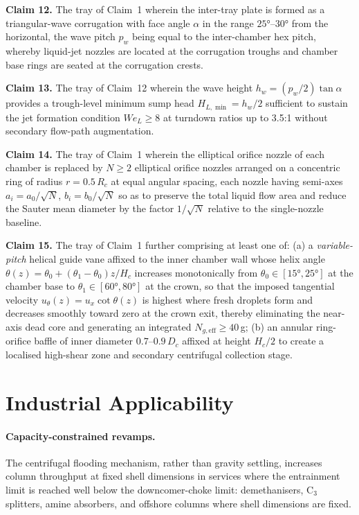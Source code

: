 \documentclass[11pt,letterpaper]{article}
\newcommand{\We}{\mathit{We}}
\begin{document}
\textbf{Claim 12.}
The tray of Claim~1 wherein the inter-tray plate is formed as a
triangular-wave corrugation with face angle $\alpha$ in the range
$25°$--$30°$ from the horizontal, the wave pitch $p_w$ being equal to
the inter-chamber hex pitch, whereby liquid-jet nozzles are located at
the corrugation troughs and chamber base rings are seated at the
corrugation crests.

\textbf{Claim 13.}
The tray of Claim~12 wherein the wave height $h_w = (p_w/2)\tan\alpha$
provides a trough-level minimum sump head $H_{L,\min} = h_w/2$
sufficient to sustain the jet formation condition
$\We_L \ge 8$ at turndown ratios up to 3.5:1 without secondary
flow-path augmentation.

\textbf{Claim 14.}
The tray of Claim~1 wherein the elliptical orifice nozzle of each
chamber is replaced by $N \ge 2$ elliptical orifice nozzles arranged
on a concentric ring of radius $r = 0.5\,R_c$ at equal angular spacing,
each nozzle having semi-axes $a_i = a_0/\sqrt{N}$, $b_i = b_0/\sqrt{N}$
so as to preserve the total liquid flow area and reduce the Sauter mean
diameter by the factor $1/\sqrt{N}$ relative to the single-nozzle
baseline.

\textbf{Claim 15.}
The tray of Claim~1 further comprising at least one of: (a) a
\emph{variable-pitch} helical guide vane affixed to the inner
chamber wall whose helix angle $\theta(z) = \theta_0 +
(\theta_1-\theta_0)z/H_c$ increases monotonically from
$\theta_0 \in [15°, 25°]$ at the chamber base to
$\theta_1 \in [60°, 80°]$ at the crown, so that the imposed
tangential velocity $u_\theta(z) = u_x\cot\theta(z)$ is highest
where fresh droplets form and decreases smoothly toward zero at
the crown exit, thereby eliminating the near-axis dead core and
generating an integrated $N_{g,\mathrm{eff}} \ge 40$\,g; (b) an
annular ring-orifice baffle of inner diameter $0.7$--$0.9\,D_c$
affixed at height $H_c/2$ to create a localised high-shear zone
and secondary centrifugal collection stage.

\section{Industrial Applicability}
\label{sec:applicability}

\paragraph{Capacity-constrained revamps.}
The centrifugal flooding mechanism, rather than gravity settling, increases
column throughput at fixed shell dimensions in services where the
entrainment limit is reached well below the downcomer-choke limit:
demethanisers, C$_3$ splitters, amine absorbers, and offshore columns
where shell dimensions are fixed.
\end{document}
